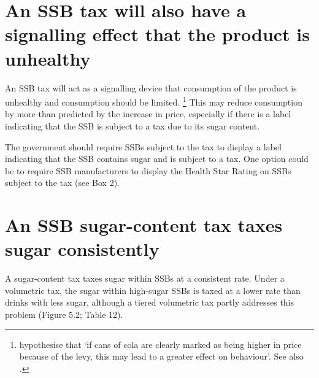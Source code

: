 \documentclass[embargoed]{grattan}
\begin{document}
\section{An SSB tax will also have a signalling effect that the product is unhealthy }\label{an-ssb-tax-will-also-have-a-signalling-effect-that-the-product-is-unhealthy}

An SSB tax will act as a signalling device that consumption of the product is unhealthy and consumption should be limited.%
\footnote{\textcite{Team2016Sugartaxhow} hypothesise that `if cans of cola are clearly marked as being higher in price because of the levy, this may lead to a greater effect on behaviour'.
See also \textcites{Yang2010Gainweightgoing}{Thow2011Taxingsoftdrinks}{Friedman2012Sugarsweetenedbeverage}{Sassi2013rolefiscalpolicies}{Thow2010effectfiscalpolicy}{Kaplin2011NationalStrategyCombat}{Kaplin2013Usingeconomicpolicy}.} This may reduce consumption by more than predicted by the increase in price, especially if there is a label indicating that the SSB is subject to a tax due to its sugar content.

The government should require SSBs subject to the tax to display a label indicating that the SSB contains sugar and is subject to a tax.
One option could be to require SSB manufacturers to display the Health Star Rating on SSBs subject to the tax (see Box 2).

\section{An SSB sugar-content tax taxes sugar consistently}\label{an-ssb-sugar-content-tax-taxes-sugar-consistently}

A sugar-content tax taxes sugar within SSBs at a consistent rate.
Under a volumetric tax, the sugar within high-sugar SSBs is taxed at a lower rate than drinks with less sugar, although a tiered volumetric tax partly addresses this problem (Figure 5.2; Table 12).
\end{document}
